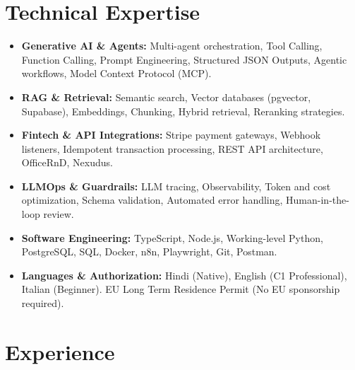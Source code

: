 \documentclass[10pt,a4paper]{article}
\begin{document}
\section{Technical Expertise}
\begin{itemize}
  \item \textbf{Generative AI \& Agents:} Multi-agent orchestration, Tool Calling, Function Calling, Prompt Engineering, Structured JSON Outputs, Agentic workflows, Model Context Protocol (MCP).
  \item \textbf{RAG \& Retrieval:} Semantic search, Vector databases (pgvector, Supabase), Embeddings, Chunking, Hybrid retrieval, Reranking strategies.
  \item \textbf{Fintech \& API Integrations:} Stripe payment gateways, Webhook listeners, Idempotent transaction processing, REST API architecture, OfficeRnD, Nexudus.
  \item \textbf{LLMOps \& Guardrails:} LLM tracing, Observability, Token and cost optimization, Schema validation, Automated error handling, Human-in-the-loop review.
  \item \textbf{Software Engineering:} TypeScript, Node.js, Working-level Python, PostgreSQL, SQL, Docker, n8n, Playwright, Git, Postman.
  \item \textbf{Languages \& Authorization:} Hindi (Native), English (C1 Professional), Italian (Beginner). EU Long Term Residence Permit (No EU sponsorship required).
\end{itemize}

\section{Experience}
\end{document}
